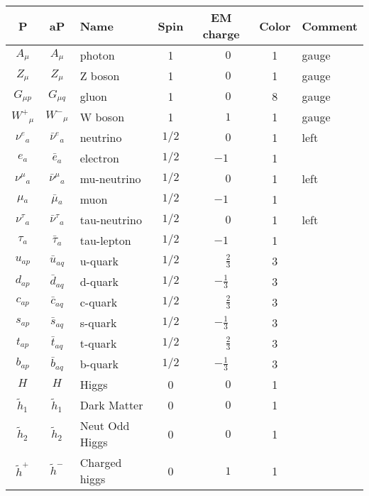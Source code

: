 \begin{tabular}{|cc|l|c|c|c|l|} \hline
P & aP & Name & Spin  & EM charge & Color & Comment \\ \hline
$A_{\mu }$&$A_{\mu }$&photon        &1           & $\phantom{-}0$ &1    &gauge\\
$Z_{\mu }$&$Z_{\mu }$&Z boson       &1           & $\phantom{-}0$ &1    &gauge\\
$G_{\mu p}$&$G_{\mu q}$&gluon         &1           & $\phantom{-}0$ &8    &gauge\\
$W^+{}_{\mu }$&$W^-{}_{\mu }$&W boson       &1           &$\phantom{-}1$ &1    &gauge\\
$\nu^e{}_{a}$&$\bar{\nu}^e{}_{a}$&neutrino      &$1/2$       & $\phantom{-}0$ &1    &left\\
$e{}_{a}$ &$\bar{e}{}_{a}$&electron      &$1/2$       &$-1$ &1    &   \\
$\nu^\mu{}_{a}$&$\bar{\nu}^\mu{}_{a}$&mu-neutrino   &$1/2$       & $\phantom{-}0$ &1    &left\\
$\mu{}_{a}$&$\bar{\mu}{}_{a}$&muon          &$1/2$       &$-1$ &1    &   \\
$\nu^\tau{}_{a}$&$\bar{\nu}^\tau{}_{a}$&tau-neutrino  &$1/2$       & $\phantom{-}0$ &1    &left\\
$\tau{}_{a}$&$\bar{\tau}{}_{a}$&tau-lepton    &$1/2$       &$-1$ &1    &   \\
$u{}_{ap}$&$\bar{u}{}_{aq}$&u-quark       &$1/2$       &$\phantom{-}\frac{2}{3}$ &3    &   \\
$d{}_{ap}$&$\bar{d}{}_{aq}$&d-quark       &$1/2$       &$-\frac{1}{3}$ &3    &   \\
$c{}_{ap}$&$\bar{c}{}_{aq}$&c-quark       &$1/2$       &$\phantom{-}\frac{2}{3}$ &3    &   \\
$s{}_{ap}$&$\bar{s}{}_{aq}$&s-quark       &$1/2$       &$-\frac{1}{3}$ &3    &   \\
$t{}_{ap}$&$\bar{t}{}_{aq}$&t-quark       &$1/2$       &$\phantom{-}\frac{2}{3}$ &3    &   \\
$b{}_{ap}$&$\bar{b}{}_{aq}$&b-quark       &$1/2$       &$-\frac{1}{3}$ &3    &   \\
$H_{}$    &$H_{}$    &Higgs         &0           & $\phantom{-}0$ &1    &   \\
$\widetilde{h}_1{}_{}$&$\widetilde{h}_1{}_{}$&Dark Matter   &0           & $\phantom{-}0$ &1    &   \\
$\widetilde{h}_2{}_{}$&$\widetilde{h}_2{}_{}$&Neut Odd Higgs &0           & $\phantom{-}0$ &1    &   \\
$\widetilde{h}^+{}_{}$&$\widetilde{h}^-{}_{}$&Charged higgs &0           &$\phantom{-}1$ &1    &   \\ \hline
\end{tabular}
